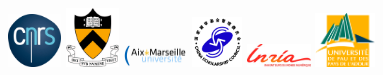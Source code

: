 \documentclass[oneside,english,onecolumn,letterpaper]{book}
\begin{document}
\begin{figure}[htbp]
\begin{center}
\includegraphics[width=0.125\textwidth]{figures/logo_cnrs}
\includegraphics[width=0.125\textwidth]{figures/logo_princeton}
\includegraphics[width=0.15\textwidth]{figures/logo_aix_marseille_universite}
\includegraphics[width=0.12\textwidth]{figures/logo_CSC_China}
\includegraphics[width=0.15\textwidth]{figures/logo_inria}
\includegraphics[width=0.14\textwidth]{figures/logo_UPPA}
\end{center}

\vspace*{2truemm}


\end{figure}
\end{document}
